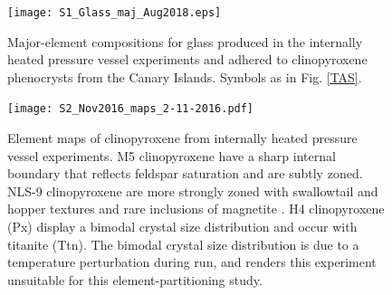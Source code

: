 \documentclass[final,authoryear,3p,times,twocolumn]{elsarticle}
\begin{document}
\begin{figure}
\begin{center}
\texttt{[image: S1\_Glass\_maj\_Aug2018.eps]}
\caption{Major-element compositions for glass produced in the internally heated pressure vessel experiments and adhered to clinopyroxene phenocrysts from the Canary Islands. Symbols as in Fig. \ref{TAS}.}
\label{S2_glass}
\end{center}
\end{figure}


\begin{figure}
\begin{center}
\texttt{[image: S2\_Nov2016\_maps\_2-11-2016.pdf]}
\caption[Element maps of clinopyroxene from internally heated pressure vessel experiments]{Element maps of clinopyroxene from internally heated pressure vessel experiments. M5 clinopyroxene have a sharp internal boundary that reflects feldspar saturation and are subtly zoned. NLS-9 clinopyroxene are more strongly zoned with swallowtail and hopper textures and rare inclusions of magnetite \citep[cf.][]{Walker1976, Lofgren1989,Shea2013}. H4 clinopyroxene (Px) display a bimodal crystal size distribution and occur with titanite (Ttn). The bimodal crystal size distribution is due to a temperature perturbation during run, and renders this experiment unsuitable for this element-partitioning study.}
\label{ElementMap_Supplement}
\end{center}
\end{figure}

\end{document}
